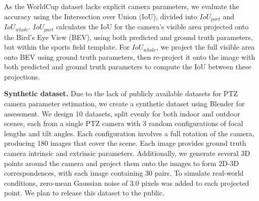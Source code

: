 \begin{table}[ht]
\caption{Subset dataset used in experiments.}
\label{tab:subset_dataset}
    \centering
\end{table}


As the WorldCup dataset lacks explicit camera parameters, we evaluate the accuracy using the Intersection over Union (IoU), divided into $IoU_{part}$ and $IoU_{whole}$. $IoU_{part}$ calculates the IoU for the camera's visible area projected onto the Bird's Eye View (BEV), using both predicted and ground truth parameters, but within the sports field template. For $IoU_{whole}$, we project the full visible area onto BEV using ground truth parameters, then re-project it onto the image with both predicted and ground truth parameters to compute the IoU between these projections.

\textbf{Synthetic dataset.}
Due to the lack of publicly available datasets for PTZ camera parameter estimation, we create a synthetic dataset using Blender for assessment. We design 10 datasets, split evenly for both indoor and outdoor scenes, each from a single PTZ camera with 3 random configurations of focal lengths and tilt angles. Each configuration involves a full rotation of the camera, producing 180 images that cover the scene. Each image provides ground truth camera intrinsic and extrinsic parameters. Additionally, we generate several 3D points around the camera and project them onto the images to form 2D-3D correspondences, with each image containing 30 pairs. To simulate real-world conditions, zero-mean Gaussian noise of 3.0 pixels was added to each projected point. We plan to release this dataset to the public.

